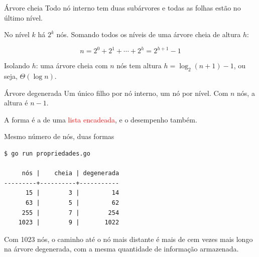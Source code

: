 \documentclass{beamer}
\newcommand{\tcr}[1]{\textcolor{red}{#1}}
\begin{document}
\begin{frame}{Árvore cheia}
  Todo nó interno tem duas subárvores e todas as folhas estão no último nível.

  \vspace{0.3cm}
  \begin{center}
  \end{center}

  \vspace{0.3cm}
  No nível $k$ há $2^k$ nós. Somando todos os níveis de uma árvore cheia de
  altura $h$:

  \[ n = 2^0 + 2^1 + \cdots + 2^h = 2^{h+1} - 1 \]

  Isolando $h$: uma árvore cheia com $n$ nós tem altura
  $h = \log_2(n+1) - 1$, ou seja, $\Theta(\log n)$.
\end{frame}

\begin{frame}{Árvore degenerada}
  Um único filho por nó interno, um nó por nível. Com $n$ nós, a altura é
  $n - 1$.

  \vspace{0.3cm}
  \begin{center}
  \end{center}

  \vspace{0.3cm}
  A forma é a de uma \tcr{lista encadeada}, e o desempenho também.
\end{frame}

\begin{frame}[fragile]{Mesmo número de nós, duas formas}
  \begin{verbatim}
$ go run propriedades.go

     nós |    cheia | degenerada
---------+----------+-----------
      15 |        3 |         14
      63 |        5 |         62
     255 |        7 |        254
    1023 |        9 |       1022
  \end{verbatim}

  \vspace{0.3cm}
  Com 1023 nós, o caminho até o nó mais distante é mais de cem vezes mais longo
  na árvore degenerada, com a mesma quantidade de informação armazenada.
\end{frame}
\end{document}
